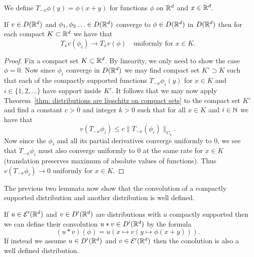 \documentclass[twoside, a4paper, 10pt]{amsart}
\begin{document}
We define $T_{-x}\phi(y) = \phi(x+y)$ for functions $\phi$ on $\mathbb{R}^d$ and $x \in \mathbb{R}^d$.

\begin{lemma}\label{lemma: T_x v continuous} If $v \in D(\mathbb{R}^d)$ and $\phi_1, \phi_2 \ldots \in D(\mathbb{R}^d)$ converge to $\phi \in D(\mathbb{R}^d)$ in $D(\mathbb{R}^d)$ then for each compact $K \subset \mathbb{R}^d$ we have that $$T_x v (\phi_i) \to T_xv (\phi) \quad \text{uniformly for } x \in K.$$

\end{lemma}

\begin{proof} Fix a compact set $K \subset \mathbb{R}^d$. By linearity, we only need to show the case $\phi=0$. Now since $\phi_i$ converge in $D(\mathbb{R}^d)$ we may find compact set $K' \supset K$ such that each of the compactly supported functions $T_{-x} \phi_i(y)$ for $x \in K$ and $i \in \{1,2,\ldots \}$ have support inside $K'$. It follows that we may now apply Theorem~\ref{thm: distributions are lipschitz on compact sets} to the compact set $K'$ and find a constant $c>0$ and integer $k>0$ such that for all $x \in K$ and $i \in \mathbb{N}$ we have that $$v(T_{-x}\phi_i) \leq c \| T_{-x}(\phi_i) \|_{C_k}.$$ Now since the $\phi_i$ and all its partial derivatives converge uniformly to $0$, we see that $T_{-x}\phi_i$ must also converge uniformly to $0$ at the same rate for $x \in K$ (translation preserves maximum of absolute values of functions). Thus $v(T_{-x}\phi_i) \to 0$ uniformly for $x \in K$. \end{proof}

The previous two lemmata now show that the convolution of a compactly supported distribution and another distribution is well defined.

\begin{mydef} If $u \in \mathcal{E}'(\mathbb{R}^d)$ and $v \in D'(\mathbb{R}^d)$ are distributions with $u$ compactly supported then we can define their convolution $u * v \in D'(\mathbb{R}^d)$ by the formula $$(u * v)(\phi) = u(x \mapsto v(y \mapsto \phi(x+y))).$$ If instead we assume $u \in D'(\mathbb{R}^d)$ and $v \in \mathcal{E}'(\mathbb{R}^d)$ then the conolution is also a well defined distribution.

\end{mydef}
\end{document}
